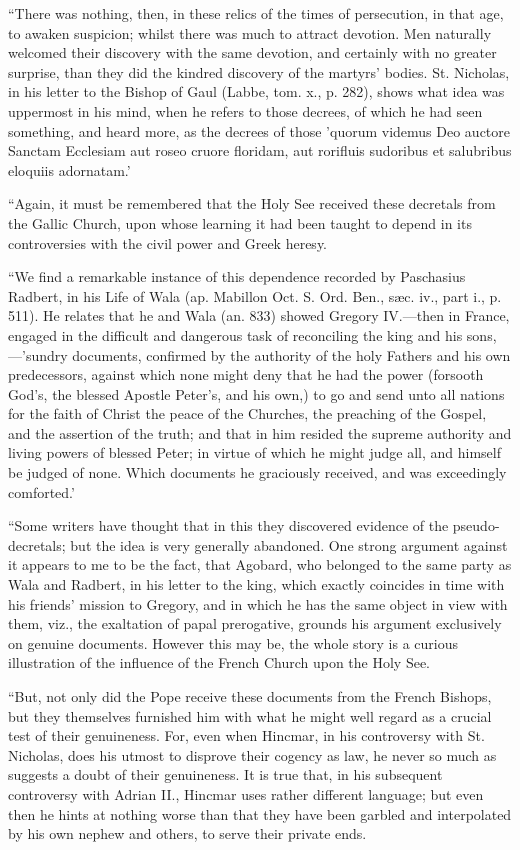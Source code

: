 ``There was nothing, then, in these relics of the
times of persecution, in that age, to awaken suspicion; whilst there
was much to attract devotion. Men naturally welcomed their discovery
with the same devotion, and certainly with no greater surprise, than
they did the kindred discovery of the martyrs' bodies. St. Nicholas,
in his letter to the Bishop of Gaul (Labbe, tom. x., p. 282), shows
what idea was uppermost in his mind, when he refers to those decrees,
of which he had seen something, and heard more, as the decrees of
those 'quorum videmus Deo auctore Sanctam Ecclesiam aut roseo cruore
floridam, aut rorifluis sudoribus et salubribus eloquiis adornatam.'

``Again, it must be remembered that the Holy See
received these decretals from the Gallic Church, upon whose learning
it had been taught to depend in its controversies with the civil power
and Greek heresy.

``We find a remarkable instance of this dependence
recorded by Paschasius Radbert, in his Life of Wala (ap.
Mabillon Oct. S. Ord. Ben., sæc. iv., part i., p. 511). He relates
that he and Wala (an. 833) showed Gregory IV.—then in France,
engaged in the difficult and dangerous task of reconciling the king
and his sons,—'sundry documents, confirmed by the authority of the
holy Fathers and his own predecessors, against which none might deny
that he had the power (forsooth God's, the blessed Apostle Peter's,
and his own,) to go and send unto all nations for the faith of Christ
the peace of the Churches, the preaching of the Gospel, and the
assertion of the truth; and that in him resided the supreme authority
and living powers of blessed Peter; in virtue of which he might judge
all, and himself be judged of none. Which documents he graciously
received, and was exceedingly comforted.'

``Some writers have thought that in this they
discovered evidence of the pseudo-decretals; but the idea is very
generally abandoned. One strong argument against it appears to me to
be the fact, that Agobard, who belonged to the same party as Wala and
Radbert, in his letter to the king, which exactly coincides in time
with his friends' mission to Gregory, and in which he has the same
object in view with them, viz., the exaltation of papal prerogative,
grounds his argument exclusively on genuine documents. However this
may be, the whole story is a curious illustration of the influence of
the French Church upon the Holy See.

``But, not only did the Pope receive these
documents from the French Bishops, but they themselves furnished him
with what he might well regard as a crucial test of their genuineness.
For, even when Hincmar, in his controversy with St. Nicholas, does his
utmost to disprove their cogency as law, he never so much as suggests
a doubt of their genuineness. It is true that, in his subsequent
controversy with Adrian II., Hincmar uses rather different language;
but even then he hints at nothing worse than that they have been
garbled and interpolated by his own nephew and others, to serve their
private ends.

